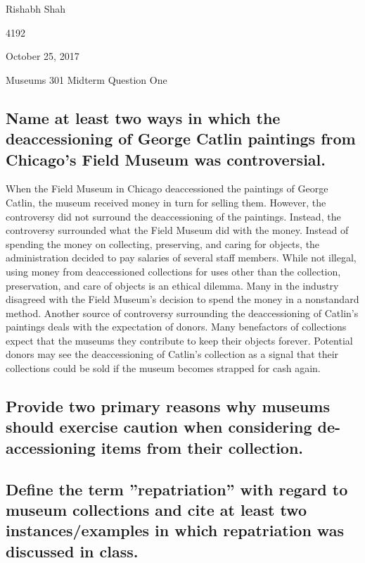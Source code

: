 \documentclass[11pt]{article}
\begin{document}
\begin{singlespacing}
{\Large\noindent Rishabh Shah

 4192

\noindent October 25, 2017

\noindent Museums 301 Midterm Question One}
\end{singlespacing}

\begin{singlespacing}
\subsection*{Name at least two ways in which the deaccessioning of George Catlin paintings from Chicago’s Field Museum was controversial.}
\end{singlespacing}

When the Field Museum in Chicago deaccessioned the paintings of George Catlin, the museum received money in turn for selling them. However, the controversy did not surround the deaccessioning of the paintings. Instead, the controversy surrounded what the Field Museum did with the money. Instead of spending the money on collecting, preserving, and caring for objects, the administration decided to pay salaries of several staff members. While not illegal, using money from deaccessioned collections for uses other than the collection, preservation, and care of objects is an ethical dilemma. Many in the industry disagreed with the Field Museum's decision to spend the money in a nonstandard method. Another source of controversy surrounding the deaccessioning of Catlin's paintings deals with the expectation of donors. Many benefactors of collections expect that the museums they contribute to keep their objects forever. Potential donors may see the deaccessioning of Catlin's collection as a signal that their collections could be sold if the museum becomes strapped for cash again.

\begin{singlespacing}
\subsection*{Provide two primary reasons why museums should exercise caution when considering de-accessioning items from their collection.}
\end{singlespacing}

\begin{singlespacing}
\subsection*{Define the term ''repatriation'' with regard to museum collections and cite at least two instances/examples in which repatriation was discussed in class.}
\end{singlespacing}
\end{document}

